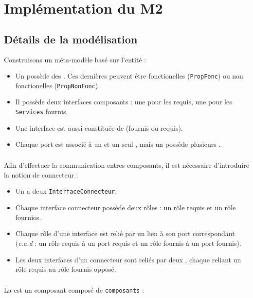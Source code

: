 \chapter{Implémentation du M2}
\section{Détails de la modélisation}
Construisons un méta-modèle basé sur l'entité \composant :
\begin{itemize}
\item 
  Un \composant{} possède des \proprietes{}. Ces dernières peuvent être fonctionelles (\verb+PropFonc+) ou non fonctionelles (\verb+PropNonFonc+).
\item 
  Il possède deux interfaces composants :  une pour les \services{} requis, une pour les \verb+Services+ fournis.
\item
  Une interface est aussi constituée de \ports{} (fournis ou requis). 
\item
  Chaque port est associé à un et un seul \service, mais un \service{} possède plusieurs \ports.  
\end{itemize}


\paragraph{}
Afin d'effectuer la communication entres composants, il est nécessaire d'introduire la notion de connecteur :

\begin{itemize}
\item 
  Un \connecteur{} a deux \verb+InterfaceConnecteur+.
\item
  Chaque interface connecteur possède deux rôles : un rôle requis \roler{} et un rôle fournios\rolef{}.
\item
  Chaque rôle d'une interface est relié par un lien \attachement{} à son port correspondant (\textit{c.a.d }: un rôle requis à un port requis et un rôle fournis à un port fournis).  
\item
  Les deux interfaces d'un connecteur sont reliés par deux \glu{}, chaque \glu{} reliant un rôle requis au rôle fournis opposé.
\end{itemize}

\paragraph{}

La \configuration{} est un composant composé de \verb+composants+ : 


